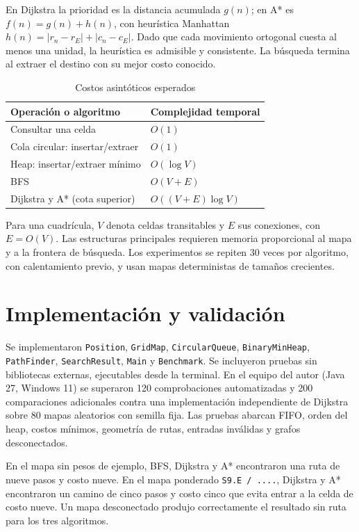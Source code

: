 \documentclass[conference]{IEEEtran}
\begin{document}
En Dijkstra la prioridad es la distancia acumulada $g(n)$; en A* es $f(n)=g(n)+h(n)$, con heur\'istica Manhattan $h(n)=|r_n-r_E|+|c_n-c_E|$. Dado que cada movimiento ortogonal cuesta al menos una unidad, la heur\'istica es admisible y consistente. La b\'usqueda termina al extraer el destino con su mejor costo conocido.

\begin{table}[H]
\caption{Costos asint\'oticos esperados}
\label{tab:complex}
\centering
\begin{tabular}{@{}ll@{}}
\toprule
Operaci\'on o algoritmo & Complejidad temporal \\
\midrule
Consultar una celda & $O(1)$ \\
Cola circular: insertar/extraer & $O(1)$ \\
Heap: insertar/extraer m\'inimo & $O(\log V)$ \\
BFS & $O(V+E)$ \\
Dijkstra y A* (cota superior) & $O((V+E)\log V)$ \\
\bottomrule
\end{tabular}
\end{table}

Para una cuadr\'icula, $V$ denota celdas transitables y $E$ sus conexiones, con $E=O(V)$. Las estructuras principales requieren memoria proporcional al mapa y a la frontera de b\'usqueda. Los experimentos se repiten 30 veces por algoritmo, con calentamiento previo, y usan mapas deterministas de tama\~nos crecientes.

\balance
\section{Implementaci\'on y validaci\'on}
Se implementaron \texttt{Position}, \texttt{GridMap}, \texttt{CircularQueue}, \texttt{BinaryMinHeap}, \texttt{PathFinder}, \texttt{SearchResult}, \texttt{Main} y \texttt{Benchmark}. Se incluyeron pruebas sin bibliotecas externas, ejecutables desde la terminal. En el equipo del autor (Java 27, Windows 11) se superaron 120 comprobaciones automatizadas y 200 comparaciones adicionales contra una implementaci\'on independiente de Dijkstra sobre 80 mapas aleatorios con semilla fija. Las pruebas abarcan FIFO, orden del heap, costos m\'inimos, geometr\'ia de rutas, entradas inv\'alidas y grafos desconectados.

En el mapa sin pesos de ejemplo, BFS, Dijkstra y A* encontraron una ruta de nueve pasos y costo nueve. En el mapa ponderado \texttt{S9.E / ....}, Dijkstra y A* encontraron un camino de cinco pasos y costo cinco que evita entrar a la celda de costo nueve. Un mapa desconectado produjo correctamente el resultado sin ruta para los tres algoritmos.
\end{document}
